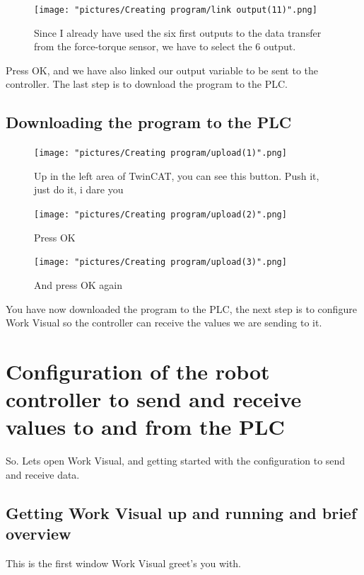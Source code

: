 \documentclass{article}
\begin{document}
\begin{figure}[h!]
    \centering
    \texttt{[image: "pictures/Creating program/link output(11)".png]}
    \caption{Since I already have used the six first outputs to the data transfer from the force-torque sensor, we have to select the 6 output.}
    \label{fig:my_label}
\end{figure}

Press OK, and we have also linked our output variable to be sent to the controller. The last step is to download the program to the PLC.

\newpage

\subsection{Downloading the program to the PLC}



\begin{figure}[h!]
    \centering
    \texttt{[image: "pictures/Creating program/upload(1)".png]}
    \caption{Up in the left area of TwinCAT, you can see this button. Push it, just do it, i dare you}
    \label{fig:my_label}
\end{figure}

\begin{figure}[h!]
    \centering
    \texttt{[image: "pictures/Creating program/upload(2)".png]}
    \caption{Press OK}
    \label{fig:my_label}
\end{figure}

\begin{figure}[h!]
    \centering
    \texttt{[image: "pictures/Creating program/upload(3)".png]}
    \caption{And press OK again}
    \label{fig:my_label}
\end{figure}

You have now downloaded the program to the PLC, the next step is to configure Work Visual so the controller can receive the values we are sending to it.

\newpage

\section{Configuration of the robot controller to send and receive values to and from the PLC}
So. Lets open Work Visual, and getting started with the configuration to send and receive data. 

\subsection{Getting Work Visual up and running and brief overview}
This is the first window Work Visual greet's you with. 
\end{document}
